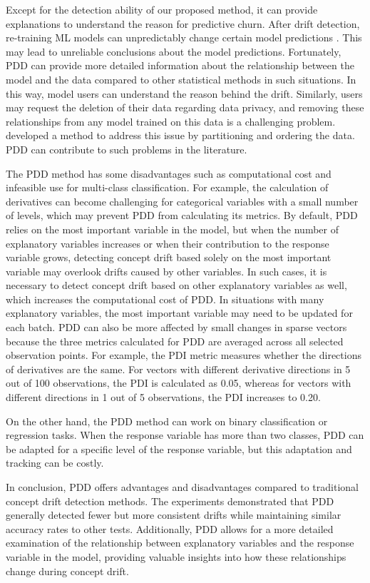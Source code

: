 \documentclass[pdflatex,sn-mathphys-ay]{sn-jnl}%
\theoremstyle{thmstyleone}%
\theoremstyle{thmstyletwo}%
\theoremstyle{thmstylethree}%
\begin{document}
Except for the detection ability of our proposed method, it can provide explanations to understand the reason for predictive churn. After drift detection, re-training ML models can unpredictably change certain model predictions \citep{daniels_2024}. This may lead to unreliable conclusions about the model predictions. Fortunately, PDD can provide more detailed information about the relationship between the model and the data compared to other statistical methods in such situations. In this way, model users can understand the reason behind the drift. Similarly, users may request the deletion of their data regarding data privacy, and removing these relationships from any model trained on this data is a challenging problem. \cite{bourtoule_2021} developed a method to address this issue by partitioning and ordering the data. PDD can contribute to such problems in the literature.

The PDD method has some disadvantages such as computational cost and infeasible use for multi-class classification. For example, the calculation of derivatives can become challenging for categorical variables with a small number of levels, which may prevent PDD from calculating its metrics. By default, PDD relies on the most important variable in the model, but when the number of explanatory variables increases or when their contribution to the response variable grows, detecting concept drift based solely on the most important variable may overlook drifts caused by other variables. In such cases, it is necessary to detect concept drift based on other explanatory variables as well, which increases the computational cost of PDD. In situations with many explanatory variables, the most important variable may need to be updated for each batch. PDD can also be more affected by small changes in sparse vectors because the three metrics calculated for PDD are averaged across all selected observation points. For example, the PDI metric measures whether the directions of derivatives are the same. For vectors with different derivative directions in 5 out of 100 observations, the PDI is calculated as 0.05, whereas for vectors with different directions in 1 out of 5 observations, the PDI increases to 0.20. 

On the other hand, the PDD method can work on binary classification or regression tasks. When the response variable has more than two classes, PDD can be adapted for a specific level of the response variable, but this adaptation and tracking can be costly. 

In conclusion, PDD offers advantages and disadvantages compared to traditional concept drift detection methods. The experiments demonstrated that PDD generally detected fewer but more consistent drifts while maintaining similar accuracy rates to other tests. Additionally, PDD allows for a more detailed examination of the relationship between explanatory variables and the response variable in the model, providing valuable insights into how these relationships change during concept drift.
\end{document}
